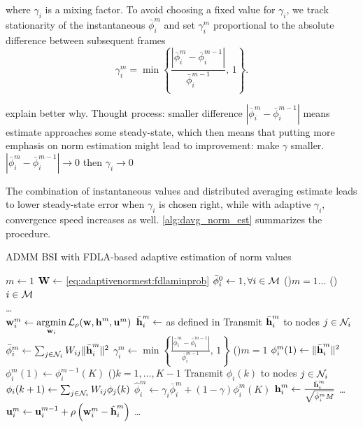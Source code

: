 \documentclass{article}
\begin{document}
where \(\gamma_i\) is a mixing factor.
To avoid choosing a fixed value for \(\gamma_i\), we track stationarity of the instantaneous \(\bar{\phi}_i^{m}\) and set \(\gamma_i^{m}\) proportional to the absolute difference between subsequent frames
\begin{equation}
    \gamma_i^{m} = \min \left\lbrace \frac{| \bar{\phi}_i^{m} - \bar{\phi}_i^{m-1} |}{\bar{\phi}_i^{m-1}},\,1\right\rbrace.
\end{equation}
\begin{todo}
    explain better why. Thought process: smaller difference \(| \bar{\phi}_i^{m} - \bar{\phi}_i^{m-1} |\) means estimate approaches some steady-state, which then means that putting more emphasis on norm estimation might lead to improvement: make \(\gamma\) smaller. \(| \bar{\phi}_i^{m} - \bar{\phi}_i^{m-1} | \rightarrow 0\) then \(\gamma_i \rightarrow 0\)
\end{todo}
The combination of instantaneous values and distributed averaging estimate leads to lower steady-state error when \(\gamma_i\) is chosen right, while with adaptive \(\gamma_i\), convergence speed increases as well.
\autoref{alg:davg_norm_est} summarizes the procedure.

\begin{algorithm}
    \caption{ADMM BSI with FDLA-based adaptive estimation of norm values}\label{alg:davg_norm_est}
    \(m\gets 1\)\;
    \(\bm{\mathrm{W}} \gets\) \eqref{eq:adaptivenormest:fdlaminprob}\;
    \(\bar{\phi}_i^{0} \gets 1, \forall i \in \mathcal{M}\)\;
    \For(){\(m=1\dots\)}
    {
        \For(){\(i \in \mathcal{M}\)}
        {
            \,\\
            \dots\\
            \(\bm{\mathrm{w}}_i^m \gets \underset{\bm{\mathrm{w}}_i}{\operatorname{argmin}} \, \mathcal{L}_{\rho} (\bm{\mathrm{w}},\bm{\mathrm{h}}^m,\bm{\mathrm{u}}^m)\)\;
            \(\bar{\bm{\mathrm{h}}}_i^{m} \gets \) as defined in \cite{blochbergerDBSI}\;
            Transmit \(\bar{\bm{\mathrm{h}}}_i^{m}\) to nodes  \(j \in \mathcal{N}_i\)\;
            \(\bar{\phi}_i^{m} \gets \sum_{j \in \mathcal{N}_i} W_{ij} \|\bar{\bm{\mathrm{h}}}_i^m\|^2\)\;
            \(\gamma_i^{m} \gets \min \left\lbrace \frac{| \bar{\phi}_i^{m} - \bar{\phi}_i^{m-1} |}{\bar{\phi}_i^{m-1}},\,1\right\rbrace\)\;
            \eIf(){\(m = 1\)}
            {
                \(\phi_i^{m}(1) \gets \|\bar{\bm{\mathrm{h}}}_i^m\|^2\)\;
            }
            {
                \(\phi_i^{m}(1) \gets \phi_i^{m-1}(K)\)\;
            }
            \For(){\(k=1,\dots,K-1\)}
            {
                Transmit \(\phi_i(k)\) to nodes  \(j \in \mathcal{N}_i\)\;
                \(\phi_i({k+1}) \gets \sum_{j \in \mathcal{N}_i} W_{ij} \phi_j({k})\)\;
            }
            \(\hat{\phi}_i^{m} \gets \gamma_i \bar{\phi}_i^{m} + (1-\gamma) \phi_i^{m}(K)\)\;
            \(\bm{\mathrm{h}}_i^{m} \gets \frac{\bar{\bm{\mathrm{h}}}_i^{m}}{\sqrt{\hat{\phi}_i^{m}M}}\)\;
            \dots\\
            \(\bm{\mathrm{u}}_i^{m} \gets \bm{\mathrm{u}}_i^{m-1} + \rho \left( \bm{\mathrm{w}}_i^{m} - \tilde{\bm{\mathrm{h}}}_i^{m} \right)\)\;
            \dots\\
        }
    }
\end{algorithm}
\end{document}

